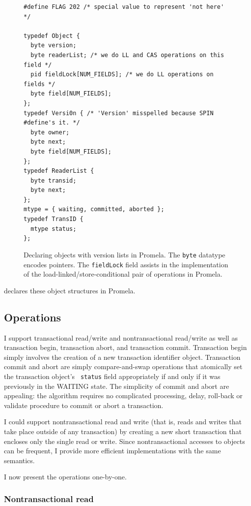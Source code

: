 \begin{figure}
\sis\fontsize{9}{10}
\begin{verbatim}
#define FLAG 202 /* special value to represent 'not here' */

typedef Object {
  byte version;
  byte readerList; /* we do LL and CAS operations on this field */
  pid fieldLock[NUM_FIELDS]; /* we do LL operations on fields */
  byte field[NUM_FIELDS];
};
typedef Versi0n { /* 'Version' misspelled because SPIN #define's it. */
  byte owner;
  byte next;
  byte field[NUM_FIELDS];
};
typedef ReaderList {
  byte transid;
  byte next;
};
mtype = { waiting, committed, aborted };
typedef TransID {
  mtype status;
};
\end{verbatim}
\caption[Declaring objects with version lists in Promela.]
 {Declaring objects with version lists in Promela.
  The \texttt{byte} datatype encodes pointers.
  The \texttt{fieldLock} field assists in the implementation of the
  load-linked/store-conditional pair of operations in Promela.}
\label{fig:promdecl}
\end{figure}

 declares these object structures in Promela.

\subsection{Operations}%
I support transactional read/write and nontransactional read/write
as well as transaction begin, transaction abort, and transaction
commit.  Transaction begin simply involves the creation of a new
transaction identifier object.  Transaction commit and abort are simply
compare-and-swap operations that atomically set the transaction object's {\tt
  status} field appropriately if and only if it was previously in the
WAITING state.
The simplicity of commit and abort are appealing: the \apex algorithm
requires no complicated processing, delay, roll-back or validate
procedure to commit or abort a transaction.

I could support nontransactional read and write (that is,
reads and writes that take place outside of any transaction) by
creating a new short transaction that encloses only the single
read or write.  Since nontransactional accesses to objects can be
frequent, I provide more efficient implementations with
the same semantics.

I now present the operations one-by-one.

\subsubsection{Nontransactional read}

